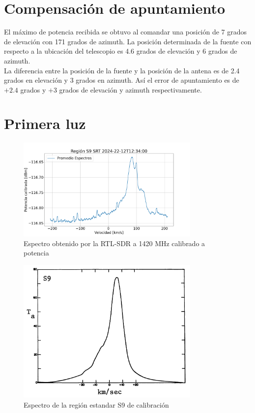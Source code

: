 \section{Compensación de apuntamiento}

El máximo de potencia recibida se obtuvo al comandar una posición de 7 grados de elevación con 171 grados de azimuth. La posición determinada de la fuente con respecto a la ubicación del telescopio es 4.6 grados de elevación y 6 grados de azimuth.\\

La diferencia entre la posición de la fuente y la posición de la antena es de 2.4 grados en elevación y 3 grados en azimuth. Así el error de apuntamiento es de $+2.4$ grados y $+3$ grados de elevación y azimuth respectivamente.\\


\section{Primera luz}

\begin{figure}
    \centering
    \includegraphics[width=0.8\textwidth]{img/h1speed}
    \caption{Espectro obtenido por la RTL-SDR a 1420 MHz calibrado a potencia}
    \label{fig:firstlight}
\end{figure}


\begin{figure}
    \centering
    \includegraphics[width=0.8\textwidth]{img/williams}
    \caption{Espectro de la región estandar S9 de calibración \cite{williams73}}
    \label{fig:williams}
\end{figure}

